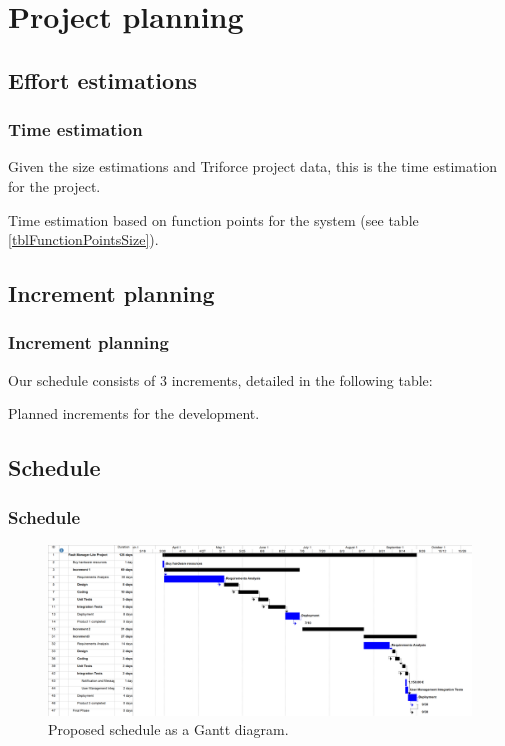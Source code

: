 \documentclass[10pt, compress,usetitleprogressbar,aspectratio=1610]{beamer}
\begin{document}
\section{Project planning}

\subsection{Effort estimations}
\begin{frame}
\frametitle{Time estimation}
Given the size estimations and Triforce project data, this is the time estimation for the project.

\begin{table}[hbtp]
\centering

\caption{Time estimation based on function points for the system (see table \ref{tblFunctionPointsSize}).}
\label{tblFunctionPointsTime}
\end{table}
\end{frame}

\subsection{Increment planning}
\begin{frame}
\frametitle{Increment planning}

Our schedule consists of 3 increments, detailed in the following table:

\begin{table}[hbtp]
\centering

\caption{Planned increments for the development.}
\label{tblIncrements}
\end{table}
\end{frame}

\subsection{Schedule}
\begin{frame}
\frametitle{Schedule}
\begin{figure}[hbtp]
\centering
\includegraphics[width=\textwidth]{../GanttDiagram.png}
\caption{Proposed schedule as a Gantt diagram.}
\label{figGantt}
\end{figure}

\end{frame}
\end{document}
